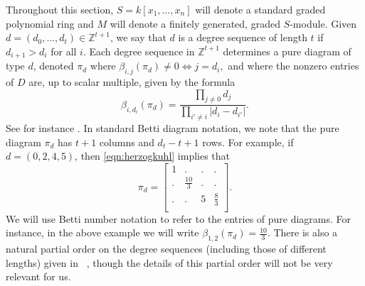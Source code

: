 \documentclass[12pt]{amsart}
\theoremstyle{remark}
\newcommand{\defi}[1]{\textsf{#1}} %
\begin{document}
Throughout this section, $S=k[x_1,\dots, x_n]$ will denote a standard graded polynomial ring and $M$ will denote a finitely generated, graded $S$-module.  Given $d=(d_0, \dots, d_t)\in \mathbb Z^{t+1}$, we say that $d$ is a \defi{degree sequence of length $t$} if $d_{i+1}>d_i$ for all $i$.  Each degree sequence in $\mathbb Z^{t+1}$ determines a \defi{pure diagram of type $d$}, denoted $\pi_d$ where
$
 \beta_{i,j}(\pi_d)\ne 0 \iff j=d_i,
$
and where the nonzero entries of $D$ are, up to scalar multiple, given by the formula
\begin{equation}\label{eqn:herzogkuhl}
\beta_{i,d_i}(\pi_d)=\frac{\prod_{j\ne 0} d_j}{\prod_{i'\ne i} |d_i-d_{i'}|}.
\end{equation}
See for instance \cite[Definition 2.3]{boij-sod1}.
In standard Betti diagram notation, we note that the pure diagram $\pi_d$ has $t+1$ columns and $d_t-t+1$ rows. For example, if $d=(0,2,4,5)$, then \eqref{eqn:herzogkuhl} implies that
\[
\pi_d = \begin{bmatrix}
1& . & . & .\\
 . & \frac{10}{3} & . & .\\
 . & . & 5 & \frac{8}{3}\\
 \end{bmatrix}.
\]
We will use Betti number notation to refer to the entries of pure diagrams.  For instance, in the above example we will write $\beta_{1,2}(\pi_d) = \frac{10}{3}$.  
There is also a natural partial order on the degree sequences (including those of different lengths) given in ~\cite[Definition~2]{boij-sod2}, though the details of this partial order will not be very relevant for us.
\end{document}
